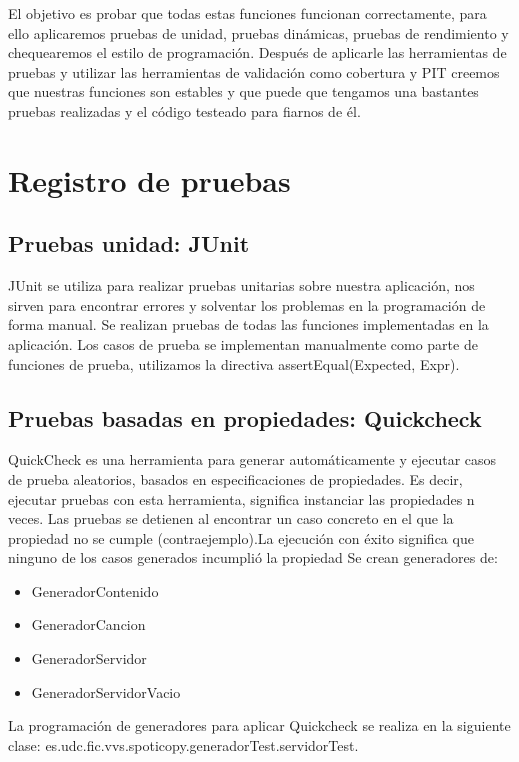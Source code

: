 \documentclass[12pt, a4paper, titlepage]{article}
\begin{document}
	El objetivo es probar que todas estas funciones funcionan correctamente, para ello aplicaremos pruebas de unidad, pruebas dinámicas, pruebas de rendimiento y chequearemos el estilo de programación.
	Después de aplicarle las herramientas de pruebas y utilizar las herramientas de validación como cobertura y PIT creemos que nuestras funciones son estables y que puede que tengamos una bastantes pruebas realizadas y el código testeado para fiarnos de él. 
	
	\section{Registro de pruebas}
	\subsection{Pruebas unidad: JUnit}
	JUnit se utiliza para realizar pruebas unitarias sobre nuestra aplicación, nos sirven para encontrar errores y solventar los problemas en la programación de forma manual.
	Se realizan pruebas de todas las funciones implementadas en la aplicación.
	Los casos de prueba se implementan manualmente como parte de funciones de prueba, utilizamos la directiva assertEqual(Expected, Expr).
	\subsection{Pruebas basadas en propiedades: Quickcheck}
	QuickCheck es una  herramienta para generar automáticamente y ejecutar casos de prueba aleatorios, basados en especificaciones de propiedades. Es decir, ejecutar pruebas con esta herramienta, significa instanciar las propiedades n veces. Las pruebas se detienen al encontrar un caso concreto en el que la propiedad no se cumple
	(contraejemplo).La ejecución con éxito significa que ninguno de los casos generados incumplió la propiedad
	Se crean generadores de:
	\begin{itemize}
		\item GeneradorContenido
		\item GeneradorCancion
		\item GeneradorServidor
		\item GeneradorServidorVacio
	\end{itemize}
	
	La programación de generadores para aplicar Quickcheck se realiza en la siguiente clase: es.udc.fic.vvs.spoticopy.generadorTest.servidorTest. 
	
\end{document}
